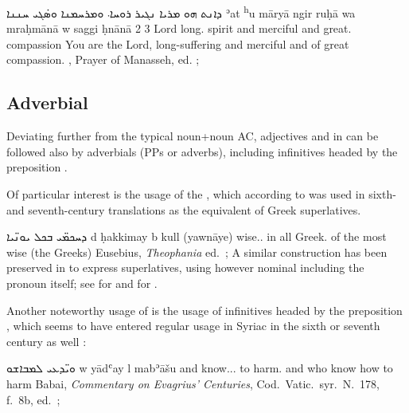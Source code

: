 {
{ܕܐܢܬ ܗܘ ܡܪܝܐ ܢܓܝܪ ܪܘܚܐ܁ ܘܡܪܚܡܢܐ ܘܣ̇ܓܝ ܚܢܢܐ}
{ʾat \cb{}\textsuperscript{h}u māryā ngir ruḥā wa\cb{} mraḥmānā w\cb{} saggi ḥnānā} 
{2\masc{} \cb{}3\masc{} Lord long.\cst{} spirit and\cb{} merciful and\cb{} great.\cst{} compassion}
{You are the Lord, long-suffering and merciful and of great compassion.}
{\Pesh, Prayer of Manasseh, ed. \cite[A7]{BaarsSchneider};  \cite[217 (7a)]{GutmanVanPeursen}}


\subsection{Adverbial \secns}

Deviating further from the typical noun+noun AC, adjectives and  in \cst* can be followed also by adverbials (PPs or adverbs), including infinitives headed by the preposition  \parencites[76, \S 96b]{MuraokaSyriac}[53ff.]{BrockConstruct}.

Of particular interest is the usage of the \secn {},  which according to \citet[54f.]{BrockConstruct}  was used in sixth- and seventh-century translations as the equivalent of  Greek superlatives. 

{ܕܚܟܡ̈ܝ ܒܟܠ ܝܘܢ̈ܝܐ}
{d\cb{} ḥakkimay b\cb{} kull (yawnāye)}
{\lnk\cb{} wise.\mpl.\cst{} in\cb{} all Greek.\pl}
{of the most wise (the Greeks)}
{Eusebius, \textit{Theophania} ed.\ \cite[II.]{Lee}; \cite[55]{BrockConstruct}\footnotemark}
A similar construction has been preserved in  to express superlatives, using however nominal \secns including the pronoun  itself; see  for \JZax and  for \JUrm.

Another noteworthy usage of  \secns is the usage of  infinitives headed by the preposition , which seems to have entered regular usage in Syriac in the sixth or seventh century as well \citep[57f.]{BrockConstruct}:

{ܘܝ̈ܕܥܝ ܠܡܒܐܫܘ}
{w\cb{} yādʿay l\cb{} mabʾāšu}
{and\cb{} know.\ptcp.\mpl.\cst{} to\cb{} harm.\inf{}}
{and who know how to harm}
{Babai, \textit{Commentary on Evagrius' Centuries}, Cod.\ Vatic.\ syr.\ N.\ 178, f.\ 8b, ed.\ \cite[22, 2]{Frankenberg}; \cite[58]{BrockConstruct}}



}
